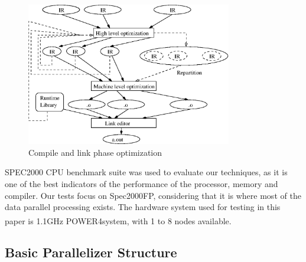 \begin{figure}[h!]
  \begin{center}
    \includegraphics[angle=0, width=0.8\textwidth]{linkphase.eps}
    \caption{\footnotesize Compile and link phase optimization}
    \label{fig:linkphase}
  \end{center}
\end{figure}

SPEC2000 CPU benchmark suite was used to evaluate our techniques, as
it is one of the best indicators of the performance of the processor,
memory and compiler. Our tests focus on Spec2000FP, considering that
it is where most of the data parallel processing exists. The hardware
system used for testing in this paper is 1.1GHz POWER4\textsuperscript \texttrademark system, with 1
to 8 nodes available.

\subsection{Basic Parallelizer Structure}


